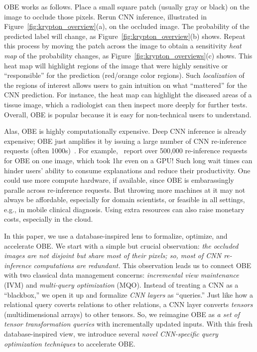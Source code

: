 OBE works as follows. Place a small square patch (usually gray or black) on the image to occlude those pixels. Rerun CNN inference, illustrated in Figure~\ref{fig:krypton_overview}(a), on the occluded image. The probability of the predicted label will change, as Figure~\ref{fig:krypton_overview}(b) shows. Repeat this process by moving the patch across the image to obtain a sensitivity \textit{heat map} of the probability changes, as Figure~\ref{fig:krypton_overviews}(c) shows. This heat map will highlight regions of the image that were highly sensitive or ``responsible'' for the prediction (red/orange color regions). Such \textit{localization} of the regions of interest allows users to gain intuition on what ``mattered'' for the CNN prediction. For instance, the heat map can highlight the diseased areas of a tissue image, which a radiologist can then inspect more deeply for further tests. Overall, OBE is popular because it is easy for non-technical users to understand.

Alas, OBE is highly computationally expensive. Deep CNN inference is already expensive; OBE just amplifies it by issuing a large number of CNN re-inference requests (often 1000s)~\cite{ketkar2017introduction}. For example,~\cite{zintgraf2017visualizing} report over 500,000 re-inference requests for OBE on one image, which took 1hr even on a GPU! Such long wait times can hinder users' ability to consume explanations and reduce their productivity. One could use more compute hardware, if available, since OBE is embarassingly paralle across re-inference requests. But throwing more machines at it may not always be affordable, especially for domain scientists, or feasible in all settings, e.g., in mobile clinical diagnosis. Using extra resources can also raise monetary costs, especially in the cloud.

In this paper, we use a database-inspired lens to formalize, optimize, and accelerate OBE. We start with a simple but crucial observation: \textit{the occluded images are not disjoint but share most of their pixels; so, most of CNN re-inference computations are redundant.} This observation leads us to connect OBE with two classical data management concerns: \textit{incremental view maintenance} (IVM) and \textit{multi-query optimization} (MQO). Instead of treating a CNN as a ``blackbox,'' we open it up and formalize \textit{CNN layers} as ``queries.'' Just like how a relational query coverts relations to other relations, a CNN layer converts \textit{tensors} (multidimensional arrays) to other tensors. So, we reimagine OBE as \textit{a set of tensor transformation queries} with incrementally updated inputs. With this fresh database-inspired view, we introduce several \textit{novel CNN-specific query optimization techniques} to accelerate OBE.

